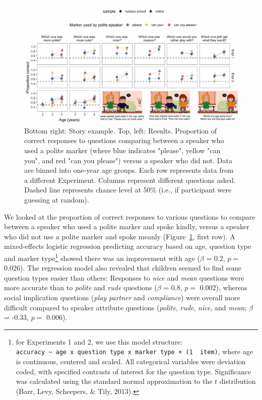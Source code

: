 \documentclass[10pt, letterpaper]{article}
\newenvironment{CodeChunk}{}{}
\begin{document}
\begin{CodeChunk}
\begin{figure}[h]

{\centering \includegraphics{figs/fig_results_placement-1} 

}

\caption[Bottom right]{Bottom right: Story example. Top, left: Results. Proportion of correct responses to questions comparing between a speaker who used a polite marker (where blue indicates "please", yellow "can you", and red "can you please") versus a speaker who did not. Data are binned into one-year age groups. Each row represents data from a different Experiment. Columns represent different questions asked. Dashed line represents chance level at 50\% (i.e., if participant were guessing at random).}\label{fig:fig_results_placement}
\end{figure}
\end{CodeChunk}

We looked at the proportion of correct responses to various questions to
compare between a speaker who used a polite marker and spoke kindly,
versus a speaker who did not use a polite marker and spoke meanly
(Figure~\ref{fig:fig_results_placement}, first row). A mixed-effects
logistic regression predicting accuracy based on age, question type and
marker type\footnote{for Experiments 1 and 2, we use this model
  structure:
  \texttt{accuracy\ \textasciitilde{}\ age\ x\ question\ type\ x\ marker\ type\ +\ (1\ \textbar{}\ item)},
  where age is continuous, centered and scaled. All categorical
  variables were deviation coded, with specified contrasts of interest
  for the question type. Significance was calculated using the standard
  normal approximation to the \(t\) distribution (Barr, Levy, Scheepers,
  \& Tily, 2013).} showed there was an improvement with age (\(\beta\) =
0.2, \(p =\) 0.026). The regression model also revealed that children
seemed to find some question types easier than others: Responses to
\emph{nice} and \emph{mean} questions were more accurate than to
\emph{polite} and \emph{rude} questions (\(\beta\) = 0.8, \(p =\)
0.002), whereas social implication questions (\emph{play partner} and
\emph{compliance}) were overall more difficult compared to speaker
attribute questions (\emph{polite}, \emph{rude}, \emph{nice}, and
\emph{mean}; \(\beta\) = -0.33, \(p =\) 0.006).
\end{document}
